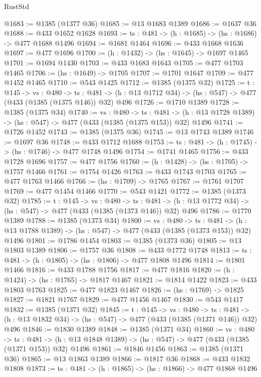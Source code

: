 \begin{lexlean}{RustStd}
\begin{coremodule}
{\begin{coremodule}
{{{{{{{{{{{{{{{{@1683 := @1385 (@1377 @36)
@1685 := @13 @1683 @1389
@1686 := @1637 @36
@1688 := @433 @1652 @1628
@1693 := {ts : @481} -> (h : @1685) -> (hs : @1686) -> @477 @1688 @1496
@1694 := @1681 @1464
@1696 := @433 @1668 @1636
@1697 := @477 @1696
@1700 := (h : @1432) -> (hs : @1645) -> @1697 @1465
@1701 := @1694 @1430
@1703 := @433 @1683 @1643
@1705 := @477 @1703 @1465
@1706 := (hs : @1649) -> @1705
@1707 := @1701 @1647
@1709 := @477 @1452 @1465
@1710 := @543 @1425
@1712 := @1385 (@1375 @32)
@1725 := {t : @145} ->
  {vs : @480} ->
  {ts : @481} -> (h : @13 @1712 @34) -> (hs : @547) -> @477 (@433 (@1385 (@1375 @146)) @32) @496
@1726 := @1710 @1389
@1728 := @1385 (@1375 @34)
@1740 := {vs : @480} ->
  {ts : @481} -> (h : @13 @1728 @1389) -> (hs : @547) -> @477 (@433 (@1385 (@1375 @153)) @32) @1496
@1741 := @1726 @1452
@1743 := @1385 (@1375 @36)
@1745 := @13 @1743 @1389
@1746 := @1697 @36
@1748 := @433 @1712 @1688
@1753 := {ts : @481} -> (h : @1745) -> (hs : @1746) -> @477 @1748 @1496
@1754 := @1741 @1465
@1756 := @433 @1728 @1696
@1757 := @477 @1756
@1760 := (h : @1428) -> (hs : @1705) -> @1757 @1466
@1761 := @1754 @1426
@1763 := @433 @1743 @1703
@1765 := @477 @1763 @1466
@1766 := (hs : @1709) -> @1765
@1767 := @1761 @1707
@1769 := @477 @1454 @1466
@1770 := @543 @1421
@1772 := @1385 (@1373 @32)
@1785 := {t : @145} ->
  {vs : @480} ->
  {ts : @481} -> (h : @13 @1772 @34) -> (hs : @547) -> @477 (@433 (@1385 (@1373 @146)) @32) @496
@1786 := @1770 @1389
@1788 := @1385 (@1373 @34)
@1800 := {vs : @480} ->
  {ts : @481} -> (h : @13 @1788 @1389) -> (hs : @547) -> @477 (@433 (@1385 (@1373 @153)) @32) @1496
@1801 := @1786 @1454
@1803 := @1385 (@1373 @36)
@1805 := @13 @1803 @1389
@1806 := @1757 @36
@1808 := @433 @1772 @1748
@1813 := {ts : @481} -> (h : @1805) -> (hs : @1806) -> @477 @1808 @1496
@1814 := @1801 @1466
@1816 := @433 @1788 @1756
@1817 := @477 @1816
@1820 := (h : @1424) -> (hs : @1765) -> @1817 @1467
@1821 := @1814 @1422
@1823 := @433 @1803 @1763
@1825 := @477 @1823 @1467
@1826 := (hs : @1769) -> @1825
@1827 := @1821 @1767
@1829 := @477 @1456 @1467
@1830 := @543 @1417
@1832 := @1385 (@1371 @32)
@1845 := {t : @145} ->
  {vs : @480} ->
  {ts : @481} -> (h : @13 @1832 @34) -> (hs : @547) -> @477 (@433 (@1385 (@1371 @146)) @32) @496
@1846 := @1830 @1389
@1848 := @1385 (@1371 @34)
@1860 := {vs : @480} ->
  {ts : @481} -> (h : @13 @1848 @1389) -> (hs : @547) -> @477 (@433 (@1385 (@1371 @153)) @32) @1496
@1861 := @1846 @1456
@1863 := @1385 (@1371 @36)
@1865 := @13 @1863 @1389
@1866 := @1817 @36
@1868 := @433 @1832 @1808
@1873 := {ts : @481} -> (h : @1865) -> (hs : @1866) -> @477 @1868 @1496
}}}}}}}}}}}}}}}}
\end{coremodule}}
\end{coremodule}
\end{lexlean}
